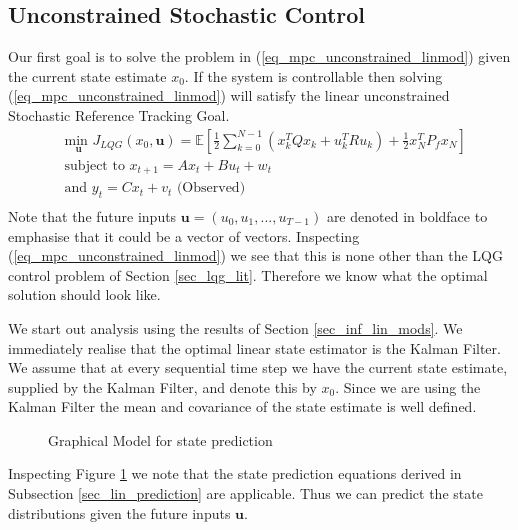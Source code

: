 \subsection{Unconstrained Stochastic Control}
Our first goal is to solve the problem in (\ref{eq_mpc_unconstrained_linmod}) given the current state estimate $x_0$. If the system is controllable then solving (\ref{eq_mpc_unconstrained_linmod}) will satisfy the linear unconstrained Stochastic Reference Tracking Goal.
\begin{equation}
\begin{aligned}
&\underset{\mathbf{u}}{\text{min }} J_{LQG}(x_0, \mathbf{u}) = \mathbb{E}\left[ \frac{1}{2}\sum_{k=0}^{N-1} \left( x_k^TQx_k + u_k^TRu_k \right) + \frac{1}{2}x_N^TP_fx_N \right] \\
& \text{subject to } x_{t+1}=Ax_t+Bu_t + w_t \\
& \text{and } y_{t}= Cx_t + v_t \text{ (Observed)}\\
\end{aligned}
\label{eq_mpc_unconstrained_linmod}
\end{equation}
Note that the future inputs $\mathbf{u}=(u_0, u_1,...,u_{T-1})$ are denoted in boldface to emphasise that it could be a vector of vectors. Inspecting (\ref{eq_mpc_unconstrained_linmod}) we see that this is none other than the LQG control problem of Section \ref{sec_lqg_lit}. Therefore we know what the optimal solution should look like.

We start out analysis using the results of Section \ref{sec_inf_lin_mods}. We immediately realise that the optimal linear state estimator is the Kalman Filter. We assume that at every sequential time step we have the current state estimate, supplied by the Kalman Filter, and denote this by $x_0$. Since we are using the Kalman Filter the mean and covariance of the state estimate is well defined. 
\begin{figure}[H] 
\centering
{}
\caption{Graphical Model for state prediction}
\label{fig_gm_mpc}
\end{figure}
Inspecting Figure \ref{fig_gm_mpc} we note that the state prediction equations derived in Subsection \ref{sec_lin_prediction} are applicable. Thus we can predict the state distributions given the future inputs $\mathbf{u}$.

